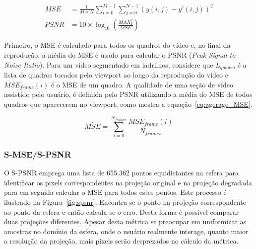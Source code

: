 \begin{align}
        \label{MSE}
        MSE&= \frac{1}{M\times N}\sum^{M-1}_{i=0}\sum^{N-1}_{j=0} \left(y(i,j) - y'(i,j)\right)^2 \\
        \label{PSNR}
        PSNR&=10 \times \log_{10}\left(\frac{MAX^2_I}{MSE}\right)
\end{align}

Primeiro, o MSE é calculado para todos os quadros do vídeo e, no final da reprodução, a média do MSE é usado para calcular o PSNR (\textit{Peak Signal-to-Noise Ratio}). Para um vídeo segmentado em ladrilhos, considere que $L_{quadro} $ é a lista de quadros tocados pelo viewport ao longo da reprodução do vídeo e $MSE_{frame}(i)$ é o MSE de um quadro. A qualidade de uma seção de vídeo assistido pelo usuário, é definida pelo PSNR utilizando a média do MSE de todos quadros que aparecerem no viewport, como mostra a equação~\ref{eq:agerage_MSE}.

\begin{equation}
        \bar{MSE} = \sum^{N_{frames}}_{i=0} \dfrac{MSE_{frame}(i)}{N_{frames}}
        \label{eq:agerage_MSE}
\end{equation}

\subsubsection{S-MSE/S-PSNR}

O S-PSNR emprega uma lista de 655.362 pontos equidistantes na esfera para identificar os pixels correspondentes na projeção original e na projeção degradada para em seguida calcular o MSE para todos estes pontos. Este processo é ilustrado na Figura~\ref{fig:spsnr}. Encontra-se o ponto na projeção correspondente ao ponto da esfera e então calcula-se o erro. Desta forma é possível comparar duas projeções diferentes. Apesar desta métrica se preocupar em uniformizar as amostras no domínio da esfera, onde o usuário realmente interage, quanto maior a resolução da projeção, mais pixels serão desprezados no cálculo da métrica.


